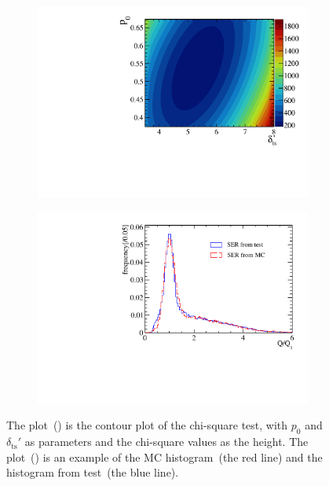 \begin{figure}[!htbp]
	\centering
	\begin{subfigure}{0.47\textwidth}
		\centering
		\includegraphics[width=\linewidth]{PMTRelated/GTmodel/cour.pdf}
		\caption{}
		\label{fig:cour}
	\end{subfigure}
	\hfill
	\begin{subfigure}{0.47\textwidth}
		\centering
		\includegraphics[width=\linewidth]{PMTRelated/GTmodel/hist.pdf}
		\caption{}
		\label{fig:hist}
	\end{subfigure}
	\caption{The plot~() is the contour plot of the chi-square test, with $p_0$ and $\delta_{\mathrm{ts}}'$ as parameters
		and the chi-square values as the height.
		The plot~() is an example of the MC histogram~(the red line) and the histogram from test~(the blue line).
	}
	\label{fig:chi}
\end{figure}


